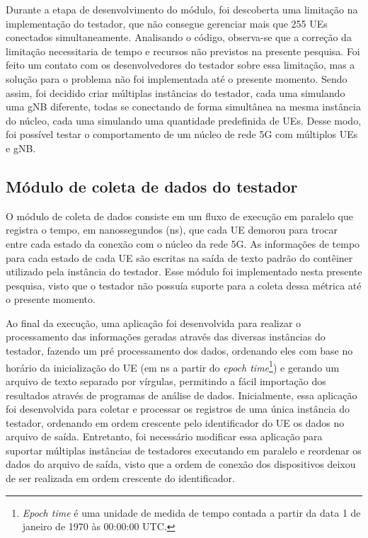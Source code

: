 Durante a etapa de desenvolvimento do módulo, foi descoberta uma limitação na implementação do testador, que não consegue gerenciar mais que 255 UEs conectados simultaneamente.
Analisando o código, observa-se que a correção da limitação necessitaria de tempo e recursos não previstos na presente pesquisa.
Foi feito um contato com os desenvolvedores do testador sobre essa limitação, mas a solução para o problema não foi implementada até o presente momento.
Sendo assim, foi decidido criar múltiplas instâncias do testador, cada uma simulando uma gNB diferente, todas se conectando de forma simultânea na mesma instância do núcleo, cada uma simulando uma quantidade predefinida de UEs.
Desse modo, foi possível testar o comportamento de um núcleo de rede 5G com múltiplos UEs e gNB.

\subsection{Módulo de coleta de dados do testador}

O módulo de coleta de dados consiste em um fluxo de execução em paralelo que registra o tempo, em nanossegundos (ns), que cada UE demorou para trocar entre cada estado da conexão com o núcleo da rede 5G.
As informações de tempo para cada estado de cada UE são escritas na saída de texto padrão do contêiner utilizado pela instância do testador.
Esse módulo foi implementado nesta presente pesquisa, visto que o testador não possuía suporte para a coleta dessa métrica até o presente momento.

Ao final da execução, uma aplicação foi desenvolvida para realizar o processamento das informações geradas através das diversas instâncias do testador, fazendo um pré processamento dos dados, ordenando eles com base no horário da inicialização do UE (em ns a partir do \textit{epoch time}\footnote{\textit{Epoch time} é uma unidade de medida de tempo contada a partir da data 1 de janeiro de 1970 às 00:00:00 UTC.}) e gerando um arquivo de texto separado por vírgulas, permitindo a fácil importação dos resultados através de programas de análise de dados.
Inicialmente, essa aplicação foi desenvolvida para coletar e processar os registros de uma única instância do testador, ordenando em ordem crescente pelo identificador do UE os dados no arquivo de saída.
Entretanto, foi necessário modificar essa aplicação para suportar múltiplas instâncias de testadores executando em paralelo e reordenar os dados do arquivo de saída, visto que a ordem de conexão dos dispositivos deixou de ser realizada em ordem crescente do identificador.

